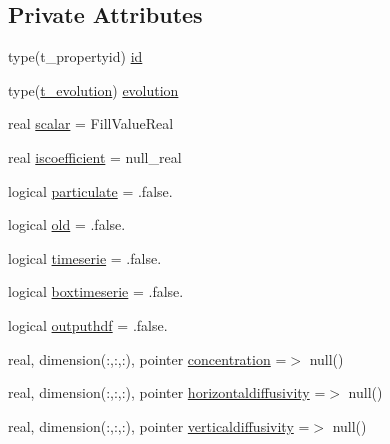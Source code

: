 \subsection*{Private Attributes}
\begin{DoxyCompactItemize}
\item 
type(t\+\_\+propertyid) \mbox{\hyperlink{structmodulesedimentproperties_1_1t__property_ab7daeabf018896be126b3e14c731f744}{id}}
\item 
type(\mbox{\hyperlink{structmodulesedimentproperties_1_1t__evolution}{t\+\_\+evolution}}) \mbox{\hyperlink{structmodulesedimentproperties_1_1t__property_a43e1601b873d0aadfaa9c249108d90d1}{evolution}}
\item 
real \mbox{\hyperlink{structmodulesedimentproperties_1_1t__property_ae34934be871a97cb52206f40da608f4d}{scalar}} = Fill\+Value\+Real
\item 
real \mbox{\hyperlink{structmodulesedimentproperties_1_1t__property_a6d857a43be1b2febc8f69710a1676e69}{iscoefficient}} = null\+\_\+real
\item 
logical \mbox{\hyperlink{structmodulesedimentproperties_1_1t__property_acc03cfc793c3e3b17056eba48c02933c}{particulate}} = .false.
\item 
logical \mbox{\hyperlink{structmodulesedimentproperties_1_1t__property_a908d65a614ea197e7b62a671c1a64d2c}{old}} = .false.
\item 
logical \mbox{\hyperlink{structmodulesedimentproperties_1_1t__property_a7188ec04eb229e4b0ac709b21ff729c3}{timeserie}} = .false.
\item 
logical \mbox{\hyperlink{structmodulesedimentproperties_1_1t__property_af69140711ab266b0da12299b2caf8f5f}{boxtimeserie}} = .false.
\item 
logical \mbox{\hyperlink{structmodulesedimentproperties_1_1t__property_abfe5af4d075dc51967b5c53ee49ca768}{outputhdf}} = .false.
\item 
real, dimension(\+:,\+:,\+:), pointer \mbox{\hyperlink{structmodulesedimentproperties_1_1t__property_a30840c8afa89e41751180235051ed62d}{concentration}} =$>$ null()
\item 
real, dimension(\+:,\+:,\+:), pointer \mbox{\hyperlink{structmodulesedimentproperties_1_1t__property_a89635b72e9515d6db1ae3405f231a4b8}{horizontaldiffusivity}} =$>$ null()
\item 
real, dimension(\+:,\+:,\+:), pointer \mbox{\hyperlink{structmodulesedimentproperties_1_1t__property_abe845847d5bef4cece4c2f37635203d2}{verticaldiffusivity}} =$>$ null()
\item 

\end{DoxyCompactItemize}
